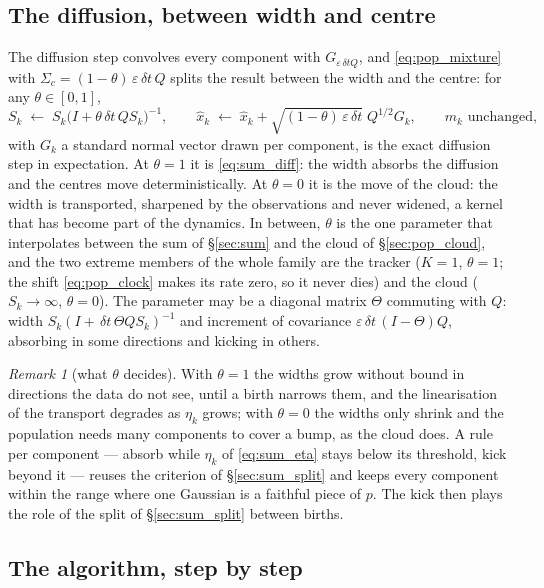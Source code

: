\documentclass[11pt,a4paper]{article}
\newcommand{\xh}{\hat{x}}
\newcommand{\eps}{\varepsilon}
\newcommand{\dt}{\,\delta t}
\theoremstyle{plain}
\theoremstyle{definition}
\theoremstyle{remark}
\newtheorem{remark}{Remark}
\begin{document}
\subsection{The diffusion, between width and centre}
\label{sec:pop_diff}

The diffusion step convolves every component with $G_{\eps\dt Q}$, and \eqref{eq:pop_mixture} with $\Sigma_c=(1-\theta)\,\eps\dt\,Q$ splits the result between the width and the centre: for any $\theta\in[0,1]$,
\begin{equation}
  S_k \;\leftarrow\; S_k\big(I+\theta\dt\,QS_k\big)^{-1}, \qquad
  \xh_k \;\leftarrow\; \xh_k+\sqrt{(1-\theta)\,\eps\dt}\;Q^{1/2}G_k, \qquad m_k \text{ unchanged},
  \label{eq:pop_diff}
\end{equation}
with $G_k$ a standard normal vector drawn per component, is the exact diffusion step in expectation. At $\theta=1$ it is \eqref{eq:sum_diff}: the width absorbs the diffusion and the centres move deterministically. At $\theta=0$ it is the move of the cloud: the width is transported, sharpened by the observations and never widened, a kernel that has become part of the dynamics. In between, $\theta$ is the one parameter that interpolates between the sum of \S\ref{sec:sum} and the cloud of \S\ref{sec:pop_cloud}, and the two extreme members of the whole family are the tracker ($K=1$, $\theta=1$; the shift \eqref{eq:pop_clock} makes its rate zero, so it never dies) and the cloud ($S_k\to\infty$, $\theta=0$). The parameter may be a diagonal matrix $\Theta$ commuting with $Q$: width $S_k(I+\dt\,\Theta QS_k)^{-1}$ and increment of covariance $\eps\dt\,(I-\Theta)Q$, absorbing in some directions and kicking in others.

\begin{remark}[what $\theta$ decides]
With $\theta=1$ the widths grow without bound in directions the data do not see, until a birth narrows them, and the linearisation of the transport degrades as $\eta_k$ grows; with $\theta=0$ the widths only shrink and the population needs many components to cover a bump, as the cloud does. A rule per component --- absorb while $\eta_k$ of \eqref{eq:sum_eta} stays below its threshold, kick beyond it --- reuses the criterion of \S\ref{sec:sum_split} and keeps every component within the range where one Gaussian is a faithful piece of $p$. The kick then plays the role of the split of \S\ref{sec:sum_split} between births.
\end{remark}

\subsection{The algorithm, step by step}
\label{sec:pop_algo}
\end{document}

